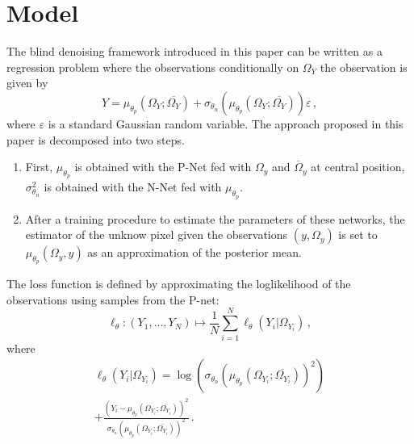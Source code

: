 \documentclass[review]{cvpr}
\begin{document}
\section{Model}
\label{sec:model}
The blind denoising framework introduced in this paper can be written as a regression problem where the observations conditionally on $\Omega_Y$ the observation is given by
$$
Y = \mu_{\theta_p}(\Omega_Y;\overline{\Omega_Y}) + \sigma_{\theta_n}(\mu_{\theta_p}(\Omega_Y;\overline{\Omega_Y}))\varepsilon\,,
$$ 
where $\varepsilon$ is a standard Gaussian random variable. The approach proposed in this paper is decomposed into two steps.
\begin{enumerate}
\item First, $\mu_{\theta_p}$ is obtained with the P-Net fed with $\Omega_y$ and $\overline \Omega_y$ at central position, $\sigma_{\theta_n}^2$ is  obtained with the N-Net fed with $\mu_{\theta_p}$.
\item After a training procedure to estimate the parameters of these networks, the estimator of the unknow pixel given the observations $(y,\Omega_y)$ is set to $\mu_{\theta_p}(\Omega_y,y)$ as an approximation of the posterior mean.
\end{enumerate}
The loss function is defined by approximating the loglikelihood of the observations using samples from the P-net:
$$
\ell_{\theta}: (Y_1,\ldots,Y_N) \mapsto \frac{1}{N}\sum_{i=1}^N \ell_{\theta}(Y_i|\Omega_{Y_i})\,,
$$
where
\begin{multline*}
\ell_{\theta}(Y_i|\Omega_{Y_i}) = \log(\sigma_{\theta_n}(\mu_{\theta_p}(\Omega_{Y_i};\overline{\Omega_{Y_i}}))^2) \\
+ \frac{(Y_i-\mu_{\theta_p}(\Omega_{Y_i};\overline{\Omega_{Y_i}}))^2}{\sigma_{\theta_n}(\mu_{\theta_p}(\Omega_{Y_i};\overline{\Omega_{Y_i}}))^2} \,.
\end{multline*}
\end{document}
